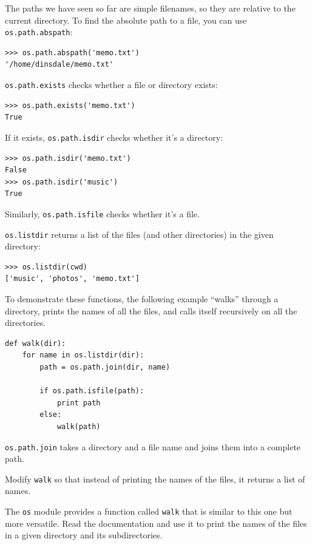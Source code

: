 \documentclass[10pt]{book}
\begin{document}
The paths we have seen so far are simple filenames, so they are
relative to the current directory.  To find the absolute path to
a file, you can use {\tt os.path.abspath}:

\beforeverb
\begin{verbatim}
>>> os.path.abspath('memo.txt')
'/home/dinsdale/memo.txt'
\end{verbatim}
\afterverb
%
{\tt os.path.exists} checks
whether a file or directory exists:


\beforeverb
\begin{verbatim}
>>> os.path.exists('memo.txt')
True
\end{verbatim}
\afterverb
%
If it exists, {\tt os.path.isdir} checks whether it's a directory:

\beforeverb
\begin{verbatim}
>>> os.path.isdir('memo.txt')
False
>>> os.path.isdir('music')
True
\end{verbatim}
\afterverb
%
Similarly, {\tt os.path.isfile} checks whether it's a file.

{\tt os.listdir} returns a list of the files (and other directories)
in the given directory:

\beforeverb
\begin{verbatim}
>>> os.listdir(cwd)
['music', 'photos', 'memo.txt']
\end{verbatim}
\afterverb
%
To demonstrate these functions, the following example
``walks'' through a directory, prints
the names of all the files, and calls itself recursively on
all the directories.


\beforeverb
\begin{verbatim}
def walk(dir):
    for name in os.listdir(dir):
        path = os.path.join(dir, name)

        if os.path.isfile(path):
            print path
        else:
            walk(path)
\end{verbatim}
\afterverb
%
{\tt os.path.join} takes a directory and a file name and joins
them into a complete path.  

\begin{ex}
Modify {\tt walk} so that instead of printing the names of
the files, it returns a list of names.
\end{ex}

\begin{ex}
The {\tt os} module provides a function called {\tt walk}
that is similar to this one but more versatile.  Read
the documentation and use it to print the names of the
files in a given directory and its subdirectories.
\end{ex}
\end{document}

